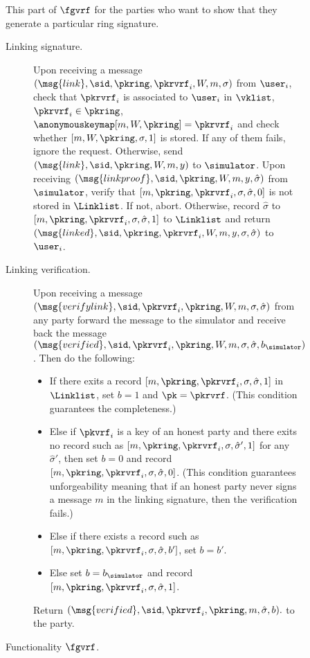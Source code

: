 \begin{figure}
	\begin{tcolorbox}
		{  This part of $ \fgvrf $ for the parties who want to show that they generate a particular ring signature.
			
		
			\begin{description}
				\item[Linking signature.] Upon receiving a message $(\msg{link}, \sid, \pkring, \pkrvrf_i, W, m,\sigma)$ from $\user_i$, check that $\pkrvrf_i $ is associated to $\user_i$ in $ \vklist $, $ \pkrvrf_i \in \pkring $, $ \anonymouskeymap[m,W, \pkring] = \pkrvrf_i $ and 
				check whether $ [m, W,\pkring, \sigma, 1] $ is stored. If any of them fails, ignore the request. Otherwise,
				send $(\msg{link}, \sid, \pkring, W, m, y)$ to $\simulator$. Upon receiving $(\msg{linkproof}, \sid, \pkring, W, m, y, \hat \sigma)$ from $\simulator$, verify that $ [m, \pkring, \pkrvrf_i, \sigma, \hat{\sigma}, 0] $ is not stored in $ \Linklist $. If not, abort. Otherwise,  record $\hat\sigma$ to $[m, \pkring, \pkrvrf_i,\sigma, \hat{\sigma}, 1]$ to $ \Linklist $ and return $(\msg{linked}, \sid, \pkring, \pkrvrf_i,W, m, y,\sigma, \hat\sigma)$ to $\user_i$.
				\item[Linking verification.] Upon receiving a message $(\msg{verifylink}, \sid, \pkrvrf_i, \pkring, W, m,\sigma,\hat\sigma)$ from any party forward the message to the simulator and receive back  the message $(\msg{verified}, \sid, \pkrvrf_i, \pkring, W,m, \sigma,\hat\sigma,  b_{\simulator})$. Then do the following:
				
				\begin{itemize}
					\item If there exits a record $ [m, \pkring,\pkrvrf_i,\sigma,\hat\sigma, 1] $ in $ \Linklist $, set $ b = 1 $ and $ \pk = \pkrvrf $. (This condition guarantees the completeness.)
					\item Else if $ \pkvrf_i $ is a key of an honest party and there exits no record such as $ [m, \pkring,\pkrvrf_i,\sigma,\hat\sigma',  1] $ for any  $  \hat\sigma'$, then set $ b = 0 $ and record $ [m, \pkring,\pkrvrf_i,\sigma,\hat\sigma,  0] $. (This condition guarantees unforgeability meaning that if an honest party never signs a message $ m $ in the linking signature, then the verification fails.)
					\item Else if there exists a record  such as $ [m, \pkring,\pkrvrf_i,\sigma,\hat\sigma,  b'] $, set $ b = b' $. 
					\item Else set $ b = b_{\simulator} $ and record $ [m, \pkring,\pkrvrf_i,\sigma,\hat\sigma,  1] $. 
				\end{itemize}
				
				Return $(\msg{verified}, \sid, \pkrvrf_i, \pkring, m, \hat\sigma, b).$ to the party.
			\end{description}
		}
	\end{tcolorbox}
	\caption{Functionality $\fgvrf$.\label{f:gvrf}}
\end{figure}


